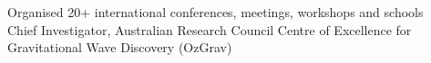 \documentclass[margin,line]{res}
\begin{document}
\begin{resume}
Organised 20+ international conferences, meetings, workshops and schools\\
Chief Investigator, Australian Research Council Centre of Excellence for Gravitational Wave Discovery (OzGrav)\\

\end{resume}
\end{document}
